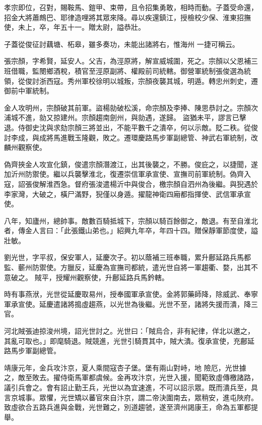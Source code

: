 \begin{pinyinscope}
 孝宗即位，召對，賜鞍馬、鎧甲、束帶，且令招集勇敢，相時而動。子蓋受命還，招金大將蕭鷓巴、耶律造哩將其眾來降。尋以疾還鎮江，授檢校少保、淮東招撫使，未上，卒，年五十一。贈太尉，謚恭壯。



 子蓋從俊征討藕塘、柘皋，雖多奏功，未能出諸將右，惟海州
 一捷可稱云。



 張宗顏，字希賢，延安人。父吉，為涇原將，解宣威城圍，死之。宗顏以父恩補三班借職，監閿鄉酒稅，積官至涇原副將、權殿前司統轄。御營軍統制張俊選為統領，從俊討浙西寇。秀州軍校徐明以城叛，宗顏夜襲其城，明遁。轉忠州刺史，遷御前中軍統制。



 金人攻明州，宗顏破其前軍。盜楊勍破松溪，命宗顏及李捧、陳思恭討之。宗顏次浦城不進，勍又掠建州。宗顏趨南劍州，與勍遇，遂歸。
 盜猶未平，謬言已擊退。侍御史沈與求劾宗顏三將並出，不能平數千之潰卒，何以示敵。貶二秩。從俊討李成，與成將馬進戰玉隆觀，敗之。遷環慶路馬步軍副總管、神武右軍統制，改麟州觀察使。



 偽齊挾金人攻宣化鎮，俊遣宗顏潛渡江，出其後襲之，不勝。俊庇之，以捷聞，遂加沂州防禦使。繼以兵襲擊淮北，復遷崇信軍承宣使、宣撫司前軍統制。偽齊入寇，詔張俊解淮西急。督府張浚遣楊沂中與俊合，檄宗顏自泗州為後繼。與猊遇於
 李家灣，大破之，橫尸滿野，猊僅以身遁。擢龍神衛四廂都指揮使、武信軍承宣使。



 八年，知廬州，總帥事。敵數百騎抵城下，宗顏以騎百餘御之，敵退。有至自淮北者，傳金人言曰：「此張鐵山弟也。」紹興九年卒，年四十四。贈保靜軍節度使，謚壯敏。



 劉光世，字平叔，保安軍人，延慶次子。初以蔭補三班奉職，累升鄜延路兵馬都監、蘄州防禦使。方臘反，延慶為宣撫司都統，遣光世自將一軍趨衢、婺，出其不意破之。
 賊平，授耀州觀察使，升鄜延路兵馬鈐轄。



 時有事燕洑，光世從延慶取易州，授奉國軍承宣使。金將郭藥師降，除威武、奉寧軍承宣使。延慶遣諸將搗虛趨燕，以光世為後繼。光世不至，諸將失援而潰，降三官。



 河北賊張迪掠浚州境，詔光世討之。光世曰：「賊烏合，非有紀律，佯北以邀之，其亂可取也。」即麾騎退。賊競進，光世引騎貫其中，賊大潰。復承宣使，充鄜延路馬步軍副總管。



 靖康元年，金兵攻汴京，夏人乘間寇杏子堡。堡有兩山對峙，地
 險厄，光世據之，敵至敗去。擢侍衛馬軍都虞候。金再攻汴京，光世入援，聞範致虛傳檄諸路，議引兵會之。會有詔止勤王兵，光世以為宜速進，不可以詔示眾。既而潰兵至，具言京城事。眾懼，光世矯以蕃官來自汴京，謂二帝決圍南去，眾稍安，進屯陜府。致虛欲合五路兵進與金戰，光世難之，別道趨虢，遂至濟州謁康王，命為五軍都提舉。




\end{pinyinscope}

